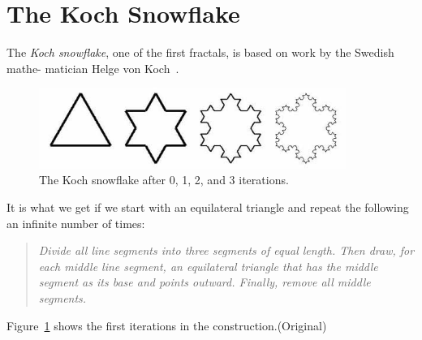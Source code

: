 \documentclass[12pt,a4paper]{article}
\begin{document}
\section{The Koch Snowflake}

The \emph{Koch snowflake},
one of the first fractals, is based on work by the Swedish mathe-
matician Helge von Koch~\cite{koch}.
\begin{figure}[h]
	\centering
	\includegraphics[width=10cm]{snowflake.jpg}
	\caption{The Koch snowflake after 0, 1, 2, and 3 iterations.}
	\label{koch}
\end{figure}
It is what we get if we start with an equilateral triangle    and repeat the following an infinite number of times:
\begin{quote}
\textit{Divide all line segments into three segments of equal length. Then draw, for each middle line segment, an equilateral triangle that has the middle segment as its base and points outward. Finally, remove all middle segments.}
\end{quote}
\begin{adjustwidth}{0cm}{-2cm}
Figure~\ref{koch} shows the first iterations in the construction.\hfill(Original)
\end{adjustwidth}
\end{document}

